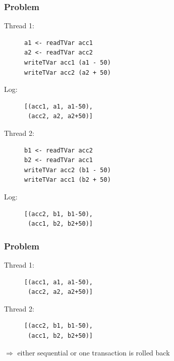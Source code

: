 \documentclass{beamer}
\begin{document}

\begin{frame}[fragile]
    \frametitle{Problem}
    \fboxsep=0pt
    \noindent
    \begin{minipage}[t]{0.48\linewidth}
      Thread 1:
    \begin{figure}
     \begin{lstlisting}[frame=single]
a1 <- readTVar acc1
a2 <- readTVar acc2
writeTVar acc1 (a1 - 50)
writeTVar acc2 (a2 + 50)
     \end{lstlisting}
    \end{figure}
    Log:
    \begin{figure}
     \begin{lstlisting}[frame=single]
[(acc1, a1, a1-50),
 (acc2, a2, a2+50)]
     \end{lstlisting}
    \end{figure}
    \end{minipage}%
    \hfill%
    \begin{minipage}[t]{0.48\linewidth}
      Thread 2:
    \begin{figure}
     \begin{lstlisting}[frame=single]
b1 <- readTVar acc2
b2 <- readTVar acc1
writeTVar acc2 (b1 - 50)
writeTVar acc1 (b2 + 50)
     \end{lstlisting}
    \end{figure}
Log:
    \begin{figure}
     \begin{lstlisting}[frame=single]
[(acc2, b1, b1-50),
 (acc1, b2, b2+50)]
    \end{lstlisting}
    \end{figure}
    \end{minipage}
\end{frame}

\begin{frame}[fragile]
    \frametitle{Problem}
    \fboxsep=0pt
    \noindent
    \begin{minipage}[t]{0.48\linewidth}
      Thread 1:
    \begin{figure}
     \begin{lstlisting}[frame=single]
[(acc1, a1, a1-50),
 (acc2, a2, a2+50)]
     \end{lstlisting}
    \end{figure}
    \end{minipage}%
    \hfill%
    \begin{minipage}[t]{0.48\linewidth}
      Thread 2:
    \begin{figure}
     \begin{lstlisting}[frame=single]
[(acc2, b1, b1-50),
 (acc1, b2, b2+50)]
     \end{lstlisting}
    \end{figure}
    \end{minipage}
    \vfill
    \pause
    $\Rightarrow$ either sequential or one transaction is rolled back
\end{frame}
\end{document}
